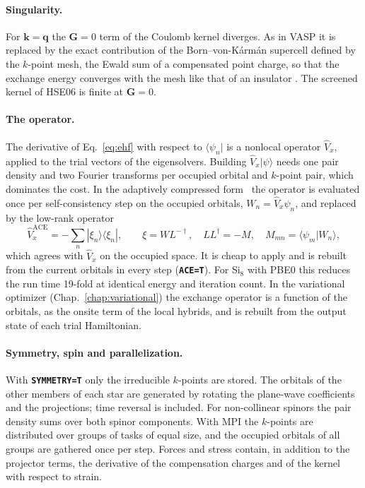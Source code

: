 \documentclass[11pt,a4paper,oneside]{book}
\newcommand{\key}[1]{\textbf{\texttt{#1}}}
\newcommand{\bra}[1]{\langle #1|}
\newcommand{\ket}[1]{|#1\rangle}
\newcommand{\braket}[2]{\langle #1|#2\rangle}
\begin{document}
\paragraph{Singularity.} For $\bm k=\bm q$ the $\bm G=0$ term of the
Coulomb kernel diverges. As in VASP it is replaced by the exact
contribution of the Born--von-K\'arm\'an supercell defined by the
$k$-point mesh, the Ewald sum of a compensated point charge, so that
the exchange energy converges with the mesh like that of an insulator
\cite{gygi86_prb34_4405}. The screened kernel of HSE06 is finite at
$\bm G=0$.

\paragraph{The operator.} The derivative of Eq.~\eqref{eq:ehf} with
respect to $\bra{\psi_n}$ is a nonlocal operator $\hat V_x$, applied
to the trial vectors of the eigensolvers. Building $\hat V_x\ket\psi$
needs one pair density and two Fourier transforms per occupied orbital
and $k$-point pair, which dominates the cost. In the adaptively
compressed form~\cite{lin16_jctc12_2242} the operator is evaluated once
per self-consistency step on the occupied orbitals,
$W_n=\hat V_x\psi_n$, and replaced by the low-rank operator
\begin{equation}
  \hat V_x^{\mathrm{ACE}}=-\sum_{n}\ket{\xi_n}\bra{\xi_n},
  \qquad
  \xi = W L^{-\dagger},\quad LL^\dagger=-M,\quad M_{mn}=\braket{\psi_m}{W_n},
\end{equation}
which agrees with $\hat V_x$ on the occupied space. It is cheap to apply
and is rebuilt from the current orbitals in every step (\key{ACE=T}).
For Si$_8$ with PBE0 this reduces the run time 19-fold at identical
energy and iteration count. In the variational optimizer
(Chap.~\ref{chap:variational}) the exchange operator is a function of the
orbitals, as the onsite term of the local hybrids, and is rebuilt from
the output state of each trial Hamiltonian.

\paragraph{Symmetry, spin and parallelization.} With
\key{SYMMETRY=T} only the irreducible $k$-points are stored. The orbitals
of the other members of each star are generated by rotating the
plane-wave coefficients and the projections; time reversal is included.
For non-collinear spinors the pair density sums over both spinor
components. With MPI the $k$-points are distributed over groups of
tasks of equal size, and the occupied orbitals of all groups are
gathered once per step. Forces and stress contain, in addition to the
projector terms, the derivative of the compensation charges and of the
kernel with respect to strain.
\end{document}
